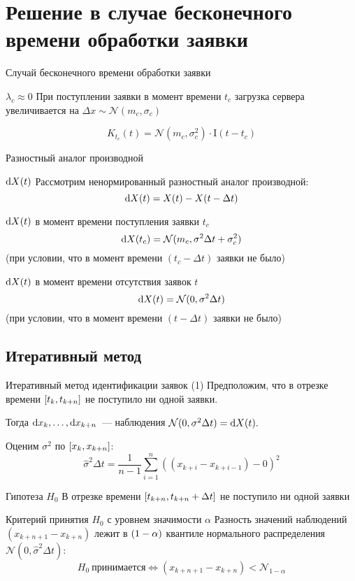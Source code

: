 \documentclass[utf8,handout]{beamer}
\begin{document}
\section[$\lambda_c \approx 0$]{Решение в случае бесконечного времени обработки заявки}
\begin{frame}{Случай бесконечного времени обработки заявки}
\begin{block}{$\lambda_c \approx 0$}
  При поступлении заявки в момент времени $t_c$ загрузка сервера увеличивается на 
  $\Delta x \sim \mathcal{N}(m_c, \sigma_c)$

  $$K_{t_c}(t) = \mathcal{N}(m_c, \sigma_c^2) \cdot \mathrm{I}(t - t_c)$$
\end{block}
\end{frame}


\begin{frame}{Разностный аналог производной}
\begin{block}{$\dif X(t)$}
  Рассмотрим ненормированный разностный аналог производной:
  $$\dif X(t) = X(t) - X(t - \Delta t)$$
\end{block}
\begin{block}{$\dif X(t)$ в момент времени поступления заявки $t_c$}
  $$\dif X(t_c) = \mathcal{N}(m_c, \sigma^2 \Delta t + \sigma_c^2)$$
  (при условии, что в момент времени $(t_c - \Delta t)$ заявки не было)
\end{block}
\begin{block}{$\dif X(t)$ в момент времени отсутствия заявок $t$}
  $$\dif X(t) = \mathcal{N}(0, \sigma^2 \Delta t)$$
  (при условии, что в момент времени $(t - \Delta t)$ заявки не было)
\end{block}
\end{frame}


\subsection{Итеративный метод}
\begin{frame}{Итеративный метод идентификации заявок (1)}
Предположим, что в отрезке времени $\sbr{t_k, t_{k+n}}$ 
не поступило ни одной заявки.

Тогда $\dif x_k, \dots, \dif x_{k+n}$~--- наблюдения 
$\mathcal{N}(0, \sigma^2 \Delta t) = \dif X(t).$

Оценим $\sigma^2$ по $\sbr{x_k, x_{k+n}}$:
$$\widehat{\sigma}^2 \Delta t = 
    \frac{1}{n-1}
        \sum\limits_{i=1}^n ((x_{k+i} - x_{k+i-1}) - 0)^2$$

\begin{block}{Гипотеза $H_0$}
  В отрезке времени $\sbr{t_{k+n}, t_{k+n} + \Delta t}$ не поступило ни 
  одной заявки
\end{block}
\begin{block}{Критерий принятия $H_0$ с уровнем значимости $\alpha$}
Разность значений наблюдений $(x_{k+n+1}-x_{k+n})$
лежит в $\del{1 - \alpha}$ квантиле
нормального распределения $\mathcal{N}(0, \widehat{\sigma}^2 \Delta t)$:
$$
H_0 \  \mathrm{\text{принимается}} \iff
        (x_{k+n+1}-x_{k+n}) < 
	    \mathcal{N}_{1 - \alpha}
$$
\end{block}
\end{frame}
\end{document}
